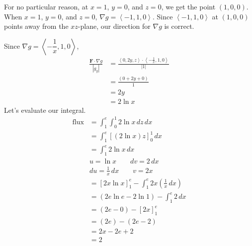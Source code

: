 \documentclass{article}
\newcommand{\lrp}[1]{\left( #1 \right)}
\newcommand{\lra}[1]{\left\langle #1 \right\rangle}
\newcommand{\lrb}[1]{\left[ #1 \right]}
\newcommand{\F}[0]{\mathbf{F}}
\begin{document}
For no particular reason, at $x=1$, $y=0$, and $z=0$, we get the point $(1,0,0)$. When $x=1$, $y=0$, and $z=0$, $\nabla g =\lra{-1, 1,0}$. Since $\lra{-1,1,0}$ at $(1,0,0)$ points away from the $xz$-plane, our direction for $\nabla g$ is correct.
\begin{center}
\end{center}
Since $\nabla g =\lra{-\dfrac{1}{x},1,0}$,
\begin{align*}
   \frac{ \F\cdot \nabla g}{\left|g_y\right|}&=\frac{\lra{0,2y,z}\cdot \lra{-\frac{1}{x},1,0}}{\left| 1\right|}\\
   &=\frac{ (0 + 2y+0)}{1}\\
   &=2y\\
   &=2\ln x\tag{$y=\ln x$}
\end{align*}
Let's evaluate our integral.
\begin{align*}
    \text{flux}&=\int_1^e\int_0^1 2 \ln x \,dz\,dx\\
    &=\int_1^e \lrb{(2\ln x) z}_0^1 \,dx\\
    &=\int_1^e 2\ln x\,dx\\
    &u=\ln x \hspace{2em}dv = 2\,dx\\
    &du=\frac{1}{x}\,dx\hspace{2em}v=2x\\
    &=\lrb{2x\ln x}_1^e - \int_1^e 2x\lrp{\frac{1}{x}\,dx}\\
    &=\lrp{2e\ln e - 2\ln 1}-\int_1^e 2\,dx\\
&=\lrp{2e - 0}-\lrb{2x}_1^e\\
&=\lrp{2e}-\lrp{2e- 2}\\
&=2x-2e+2\\
    &=\boxed{2}
\end{align*}
\end{document}
